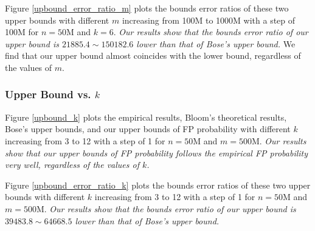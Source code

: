 Figure \ref{upbound_error_ratio_m} plots the bounds error ratios of these two upper bounds with different $m$ increasing from 100M to 1000M with a step of 100M for $n = 50$M and $k = 6$. 
\textit{Our results show that the bounds error ratio of our upper bound is $21885.4\sim150182.6$ lower than that of Bose's upper bound. }
We find that our upper bound almost coincides with the lower bound, regardless of the values of $m$. 


%
%


\subsubsection{Upper Bound vs. $k$}

Figure \ref{upbound_k} plots the empirical results, Bloom's theoretical results, Bose's upper bounds, and our upper bounds of FP probability with different $k$ increasing from 3 to 12 with a step of 1 for $n = 50$M and $m = 500$M. 
\textit{Our results show that our upper bounds of FP probability follows the empirical FP probability very well, regardless of the values of $k$.} 

Figure \ref{upbound_error_ratio_k} plots the bounds error ratios of these two upper bounds with different $k$ increasing from 3 to 12 with a step of 1 for $n = 50$M and $m = 500$M. 
\textit{Our results show that the bounds error ratio of our upper bound is $39483.8\sim64668.5$ lower than that of Bose's upper bound. }

%
%

